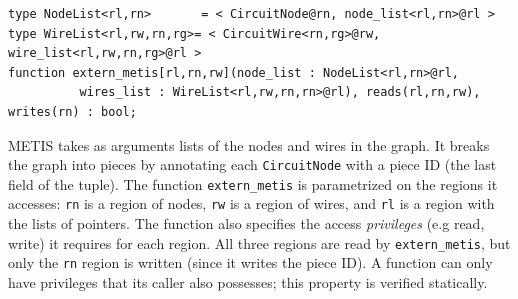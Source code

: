 \begin{lstlisting}[label={lst:metis},caption={Partition Computation}]
type NodeList<rl,rn>       = < CircuitNode@rn, node_list<rl,rn>@rl >
type WireList<rl,rw,rn,rg>= < CircuitWire<rn,rg>@rw, wire_list<rl,rw,rn,rg>@rl >
function extern_metis[rl,rn,rw](node_list : NodeList<rl,rn>@rl,
          wires_list : WireList<rl,rw,rn,rn>@rl), reads(rl,rn,rw), writes(rn) : bool;
\end{lstlisting}

METIS takes as arguments lists of the nodes and wires in
the graph.  It breaks the graph into pieces by annotating each 
{\tt CircuitNode} with a piece ID (the last field of the tuple).
The function {\tt extern\_metis} is parametrized on the regions it 
accesses: {\tt rn} is a region of nodes, {\tt rw} is a region of wires, 
and {\tt rl} is a region with the lists of pointers.  The function
also specifies the access {\em privileges} (e.g read, write) it requires for each 
region.  All three regions are read by {\tt extern\_metis}, but only the {\tt rn}
region is written (since it writes the piece ID).  A function can only 
have privileges that its caller also possesses; this property is verified statically. 

